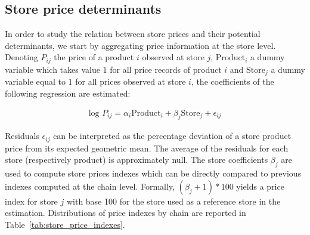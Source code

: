 \documentclass[english]{article}
\begin{document}
\subsection{Store price determinants}

In order to study the relation between store prices and their potential determinants, we start by aggregating price information at the store level. Denoting $P_{ij}$ the price of a product $i$ observed at store $j$, $\text{Product}_i$ a dummy variable which takes value $1$ for all price records of product $i$ and $\text{Store}_j$ a dummy variable equal to $1$ for all prices observed at store $i$, the coefficients of the following regression are estimated:

\begin{align}
\text{log }P_{ij} = \alpha_i \text{Product}_i + \beta_j \text{Store}_j + \epsilon_{ij}
\label{reg_product_prices}
\end{align}

Residuals $\epsilon_{ij}$ can be interpreted as the percentage deviation of a store product price from its expected geometric mean. The average of the residuals for each store (respectively product) is approximately null. The store coefficients $\beta_j$ are used to compute store prices indexes which can be directly compared to previous indexes computed at the chain level. Formally, $(\beta_j + 1) * 100$ yields a price index for store $j$ with base 100 for the store used as a reference store in the estimation. Distributions of price indexes by chain are reported in Table~\ref{tab:store_price_indexes}.
\end{document}

